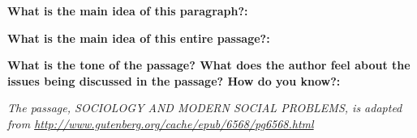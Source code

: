 \begin{enumerate}
\begin{linenumbers}
\end{linenumbers}

\textbf{What is the main idea of this paragraph?:} \hrulefill

\hrulefill

\textbf{What is the main idea of this entire passage?:} \hrulefill

\hrulefill

\hrulefill

\textbf{What is the tone of the passage? What does the author feel about the issues being discussed in the passage? How do you know?:} \hrulefill

\hrulefill

\hrulefill

\textit{The passage, SOCIOLOGY AND MODERN SOCIAL PROBLEMS, is adapted from \url{http://www.gutenberg.org/cache/epub/6568/pg6568.html}}
\end{enumerate}
